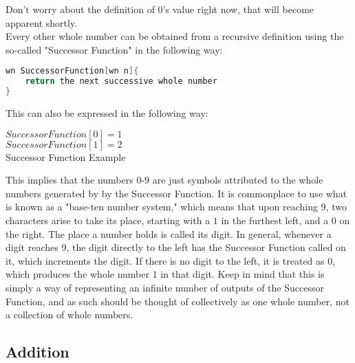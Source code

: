Don't worry about the definition of $0$'s value right now, that will become apparent shortly. \\
Every other whole number can be obtained from a recursive definition using the so-called "Successor Function" in the following way:
\begin{center}
\begin{lstlisting}[language=C, caption=Successor Function,label=lst:sucFunc]
wn SuccessorFunction[wn n]{
	return the next successive whole number
}
\end{lstlisting}
\end{center} 
This can also be expressed in the following way:
\begin{center}
$SuccessorFunction[0] = 1$\\
$SuccessorFunction[1] = 2$\\
Successor Function Example\label{eq:sucFuncEx}
\end{center}
This implies that the numbers $0$-$9$ are just symbols attributed to the whole numbers generated by by the Successor Function. It is commonplace to use what is known as a "base-ten number system," which means that upon reaching 9, two characters arise to take its place, starting with a $1$ in the furthest left, and a $0$ on the right. The place a number holds is called its digit. In general, whenever a digit reaches 9, the digit directly to the left has the Successor Function called on it, which increments the digit. If there is no digit to the left, it is treated as $0$, which produces the whole number $1$ in that digit. Keep in mind that this is simply a way of representing an infinite number of outputs of the Successor Function, and as such should be thought of collectively as one whole number, not a collection of whole numbers. \\


\subsection{Addition}

